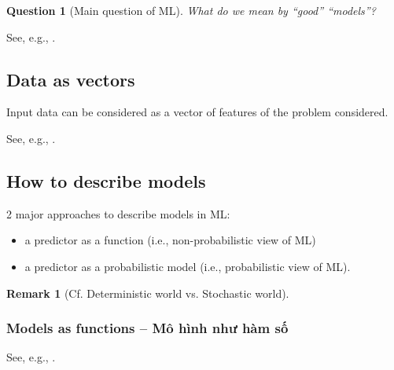 \documentclass{article}
\newtheorem{question}{Question}
\newtheorem{remark}{Remark}
\begin{document}
\begin{question}[Main question of ML]
	What do we mean by ``good'' ``models''?
\end{question}
See, e.g., \cite[Chap. 8, Sect. 8.1: Data, Models, \& Learning]{Deisenroth_Faisal_Ong2024}.

\subsection{Data as vectors}
Input data can be considered as a vector of features of the problem considered.

See, e.g., \cite[Chap. 8, Sect. 8.1.1: Data as Vectors]{Deisenroth_Faisal_Ong2024}.

\subsection{How to describe models}
2 major approaches to describe models in ML:
\begin{itemize}
	\item a predictor as a function (i.e., non-probabilistic view of ML)
	\item a predictor as a probabilistic model (i.e., probabilistic view of ML).
\end{itemize}

\begin{remark}[Cf. Deterministic world vs. Stochastic world]
	
\end{remark}

\subsubsection{Models as functions -- Mô hình như hàm số}
See, e.g., \cite[Chap. 8, Sect. 8.1.2: Models as Functions]{Deisenroth_Faisal_Ong2024}.
\end{document}
